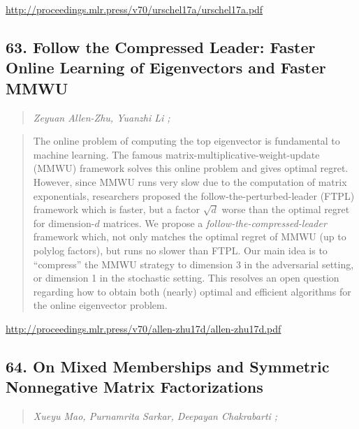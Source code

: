 \documentclass{article}
\begin{document}
\href{http://proceedings.mlr.press/v70/urschel17a/urschel17a.pdf}{http://proceedings.mlr.press/v70/urschel17a/urschel17a.pdf}

\subsection{63. Follow the Compressed Leader: Faster Online Learning of Eigenvectors and Faster MMWU}

\begin{quote}
\footnotesize{\textit{Zeyuan Allen-Zhu, Yuanzhi Li ;}}

\end{quote}

\begin{quote}
    The online problem of computing the top eigenvector is fundamental to machine learning. The famous matrix-multiplicative-weight-update (MMWU) framework solves this online problem and gives optimal regret. However, since MMWU runs very slow due to the computation of matrix exponentials, researchers proposed the follow-the-perturbed-leader (FTPL) framework which is faster, but a factor $\sqrt{d}$ worse than the optimal regret for dimension-$d$ matrices. We propose a \textit{follow-the-compressed-leader} framework which, not only matches the optimal regret of MMWU (up to polylog factors), but runs no slower than FTPL. Our main idea is to “compress” the MMWU strategy to dimension 3 in the adversarial setting, or dimension 1 in the stochastic setting. This resolves an open question regarding how to obtain both (nearly) optimal and efficient algorithms for the online eigenvector problem.  
\end{quote}

\href{http://proceedings.mlr.press/v70/allen-zhu17d/allen-zhu17d.pdf}{http://proceedings.mlr.press/v70/allen-zhu17d/allen-zhu17d.pdf}

\subsection{64. On Mixed Memberships and Symmetric Nonnegative Matrix Factorizations}

\begin{quote}
\footnotesize{\textit{Xueyu Mao, Purnamrita Sarkar, Deepayan Chakrabarti ;}}

\end{quote}
\end{document}
